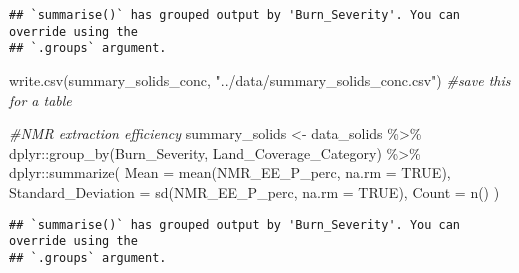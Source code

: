 \documentclass[
]{article}
\newenvironment{Shaded}{\begin{snugshade}}{\end{snugshade}}
\newcommand{\AttributeTok}[1]{\textcolor[rgb]{0.77,0.63,0.00}{#1}}
\newcommand{\CommentTok}[1]{\textcolor[rgb]{0.56,0.35,0.01}{\textit{#1}}}
\newcommand{\ConstantTok}[1]{\textcolor[rgb]{0.00,0.00,0.00}{#1}}
\newcommand{\FunctionTok}[1]{\textcolor[rgb]{0.00,0.00,0.00}{#1}}
\newcommand{\NormalTok}[1]{#1}
\newcommand{\OtherTok}[1]{\textcolor[rgb]{0.56,0.35,0.01}{#1}}
\newcommand{\SpecialCharTok}[1]{\textcolor[rgb]{0.00,0.00,0.00}{#1}}
\newcommand{\StringTok}[1]{\textcolor[rgb]{0.31,0.60,0.02}{#1}}
\begin{document}
\begin{verbatim}
## `summarise()` has grouped output by 'Burn_Severity'. You can override using the
## `.groups` argument.
\end{verbatim}

\begin{Shaded}
\begin{Highlighting}[]
\FunctionTok{write.csv}\NormalTok{(summary\_solids\_conc, }\StringTok{"../data/summary\_solids\_conc.csv"}\NormalTok{) }\CommentTok{\#save this for a table}


\CommentTok{\#NMR extraction efficiency}
\NormalTok{summary\_solids }\OtherTok{\textless{}{-}}\NormalTok{ data\_solids }\SpecialCharTok{\%\textgreater{}\%}
\NormalTok{  dplyr}\SpecialCharTok{::}\FunctionTok{group\_by}\NormalTok{(Burn\_Severity, Land\_Coverage\_Category) }\SpecialCharTok{\%\textgreater{}\%}
\NormalTok{  dplyr}\SpecialCharTok{::}\FunctionTok{summarize}\NormalTok{(}
    \AttributeTok{Mean =} \FunctionTok{mean}\NormalTok{(NMR\_EE\_P\_perc, }\AttributeTok{na.rm =} \ConstantTok{TRUE}\NormalTok{),}
    \AttributeTok{Standard\_Deviation =} \FunctionTok{sd}\NormalTok{(NMR\_EE\_P\_perc, }\AttributeTok{na.rm =} \ConstantTok{TRUE}\NormalTok{),}
    \AttributeTok{Count =} \FunctionTok{n}\NormalTok{()}
\NormalTok{  )}
\end{Highlighting}
\end{Shaded}

\begin{verbatim}
## `summarise()` has grouped output by 'Burn_Severity'. You can override using the
## `.groups` argument.
\end{verbatim}
\end{document}
